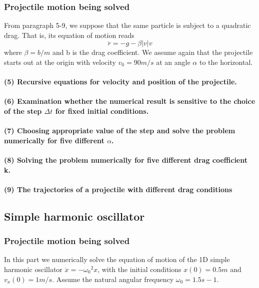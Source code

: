 \documentclass{article}
\begin{document}
\subsubsection{Projectile motion being solved}
From paragraph 5-9, we suppose that the same particle is subject to a quadratic drag. That is, its equation of motion reads\\
$$
\ddot{r} = -g- \beta |v| v
$$
where $\beta = b/m$ and b is the drag coefficient. We assume again that the projectile starts out at the origin with velocity $v_0 = 90 m/s$ at an angle $\alpha$ to the horizontal.\\
\paragraph{(5) Recursive equations for velocity and position of the projectile.}
\paragraph{(6) Examination whether the numerical result is sensitive to the choice of the step $\Delta t$ for fixed initial conditions.}
\paragraph{(7) Choosing appropriate value of the step and solve the problem numerically for five different $\alpha$.}
\paragraph{(8) Solving the problem numerically for five different drag coefficient k.}
\paragraph{(9) The trajectories of a projectile with different drag conditions}
\subsection{Simple harmonic oscillator}
\subsubsection{Projectile motion being solved}
In this part we numerically solve the equation of motion of the 1D simple harmonic
oscillator $\ddot{x} = −{\omega_0}^2x$, with the initial conditions $x(0) = 0.5 m$ and $v_x(0) = 1 m/s$. Assume the natural angular frequency $\omega_0 = 1.5 s−1$.\\
\end{document}
